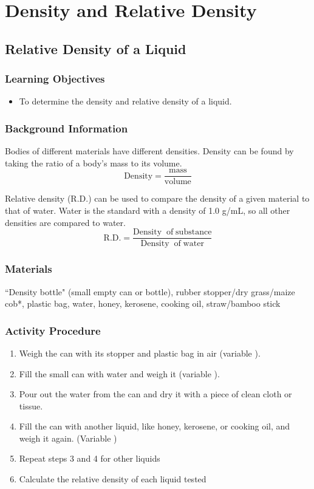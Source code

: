 \section{Density and Relative Density}

\subsection{Relative Density of a Liquid}

\subsubsection*{Learning Objectives}
\begin{itemize}
\item{To determine the density and relative density of a liquid.} 
\end{itemize}

\subsubsection*{Background Information}
Bodies of different materials have different densities.  Density can be found by taking the ratio of a body's mass to its volume.  $$\mathrm{Density} = \frac{\mathrm{mass}}{\mathrm{volume}}$$

Relative density (R.D.) can be used to compare the density of a given material to that of water.  Water is the standard with a density of 1.0 g/mL, so all other densities are compared to water.
$$\mathrm{R.D.} = \frac{\mathrm{Density\; \; of \;substance}}{\mathrm{Density\; \;of \;water}}$$

\subsubsection*{Materials}
``Density bottle" (small empty can or bottle), rubber stopper/dry grass/maize cob*, plastic bag, water, honey, kerosene, cooking oil, straw/bamboo stick


\subsubsection*{Activity Procedure}
\begin{enumerate}
\item{Weigh the can with its stopper and plastic bag in air (variable ).} 
\item{Fill the small can with water and weigh it (variable ).} 
\item{Pour out the water from the can and dry it with a piece of clean cloth or tissue.} 
\item{Fill the can with another liquid, like honey, kerosene, or cooking oil, and weigh it again. (Variable )}
\item{Repeat steps 3 and 4 for other liquids}
\item Calculate the relative density of each liquid tested
\end{enumerate}

